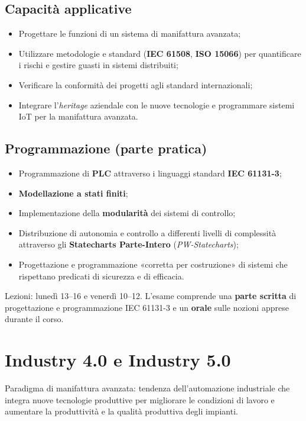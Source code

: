 \subsection{Capacità applicative}
\begin{itemize}
    \item Progettare le funzioni di un sistema di manifattura avanzata;
    \item Utilizzare metodologie e standard (\textbf{IEC 61508}, \textbf{ISO 15066}) per quantificare i rischi e gestire guasti in sistemi distribuiti;
    \item Verificare la conformità dei progetti agli standard internazionali;
    \item Integrare l'\emph{heritage} aziendale con le nuove tecnologie e programmare sistemi IoT per la manifattura avanzata.
\end{itemize}

\subsection{Programmazione (parte pratica)}
\begin{itemize}
    \item Programmazione di \textbf{PLC} attraverso i linguaggi standard \textbf{IEC 61131-3};
    \item \textbf{Modellazione a stati finiti};
    \item Implementazione della \textbf{modularità} dei sistemi di controllo;
    \item Distribuzione di autonomia e controllo a differenti livelli di complessità attraverso gli \textbf{Statecharts Parte-Intero} (\emph{PW-Statecharts});
    \item Progettazione e programmazione «corretta per costruzione» di sistemi che rispettano predicati di sicurezza e di efficacia.
\end{itemize}

\begin{note}
Lezioni: lunedì 13--16 e venerdì 10--12. L'esame comprende una \textbf{parte scritta} di progettazione e programmazione IEC 61131-3 e un \textbf{orale} sulle nozioni apprese durante il corso.
\end{note}

\section{Industry 4.0 e Industry 5.0}
\begin{defn}[Industry 4.0]
Paradigma di manifattura avanzata: tendenza dell'automazione industriale che integra nuove tecnologie produttive per migliorare le condizioni di lavoro e aumentare la produttività e la qualità produttiva degli impianti.
\end{defn}

